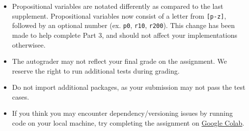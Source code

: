 \documentclass{article}
\begin{document}
    \begin{itemize}
        \item Propositional variables are notated differently as compared to the last supplement. Propositional variables now consist of a letter from \lstinline{[p-z]}, followed by an optional number (ex. \lstinline{p0}, \lstinline{r10}, \lstinline{r200}). This change has been made to help complete Part 3, and should not affect your implementations otherwisee.
        \item The autograder may not reflect your final grade on the assignment. We reserve the right to run additional tests during grading.
        \item Do not import additional packages, as your submission may not pass the test cases.
        \item If you think you may encounter dependency/versioning issues by running code on your local machine, try completing the assignment on \href{https://colab.research.google.com/}{Google Colab}.
    \end{itemize}
\end{document}
